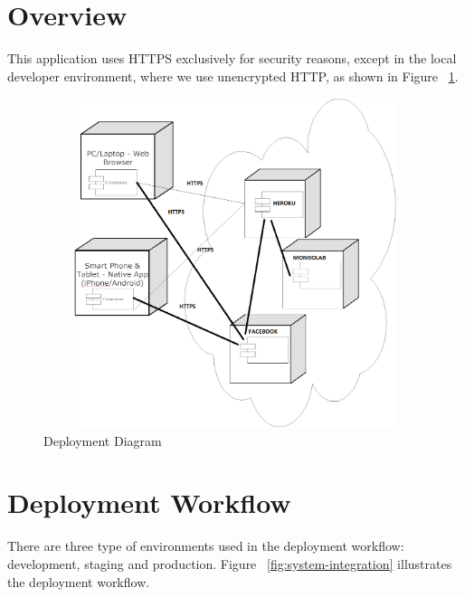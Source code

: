 
\section{Overview}
This application uses HTTPS exclusively for security reasons, except in the local developer environment, where we use unencrypted HTTP, as shown in Figure ~\ref{fig:deployment}.

\vspace{3em}
\begin{figure}[H]
\begin{center}
\includegraphics[height=3.8in,width=6.5in]{images/deployment.png}
\caption{Deployment Diagram}
\label{fig:deployment}
\end{center}
\end{figure}

\section{Deployment Workflow}
There are three type of environments used in the deployment workflow: development, staging and production. Figure ~\ref{fig:system-integration} illustrates the deployment workflow.

